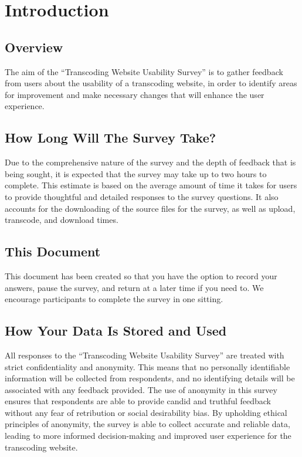 \chapter{Introduction}
\section{Overview}
The aim of the “Transcoding Website Usability Survey” is to gather feedback from users about the usability of a transcoding website, in order to identify areas for improvement and make necessary changes that will enhance the user experience.

\section{How Long Will The Survey Take?}
Due to the comprehensive nature of the survey and the depth of feedback that is being sought, it is expected that the survey may take up to two hours to complete. This estimate is based on the average amount of time it takes for users to provide thoughtful and detailed responses to the survey questions. It also accounts for the downloading of the source files for the survey, as well as upload, transcode, and download times.

\section{This Document}
This document has been created so that you have the option to record your answers, pause the survey, and return at a later time if you need to. We encourage participants to complete the survey in one sitting. 

\clearpage

\section{How Your Data Is Stored and Used}
All responses to the “Transcoding Website Usability Survey” are treated with strict confidentiality and anonymity. This means that no personally identifiable information will be collected from respondents, and no identifying details will be associated with any feedback provided. The use of anonymity in this survey ensures that respondents are able to provide candid and truthful feedback without any fear of retribution or social desirability bias. By upholding ethical principles of anonymity, the survey is able to collect accurate and reliable data, leading to more informed decision-making and improved user experience for the transcoding website.


